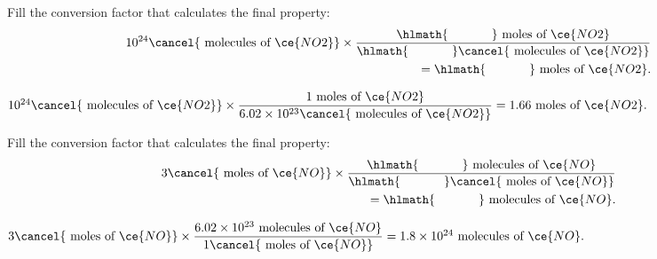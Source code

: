 \documentclass[main.tex]{subfiles}
\begin{document}
\begin{multicols*}{2}
\begin{question}[ID=\the\value{numA}]
Fill the conversion factor that calculates the final property:
 \begin{equation*}\begin{split}
10^{24}\cancel{\text{ molecules of }\ce{NO2}} \times \dfrac{\hlmath{\hspace{35pt}}\text{ moles of }\ce{NO2}}{\hlmath{\hspace{35pt}}\cancel{\text{ molecules of }\ce{NO2}}}\\
=\hlmath{\hspace{35pt}}\text{ moles of }\ce{NO2}.
\end{split}\end{equation*}
\end{question}
\begin{solution}
$
10^{24}\cancel{\text{ molecules of }\ce{NO2}} \times \dfrac{   1    \text{ moles of }\ce{NO2}}{   6.02\times 10^{23}    \cancel{\text{ molecules of }\ce{NO2}}}
=   1.66   \text{ moles of }\ce{NO2}.
$
\hspace{0.1cm}\end{solution}%
\begin{question}[ID=\the\value{numA}]
Fill the conversion factor that calculates the final property:
 \begin{equation*}\begin{split}
3\cancel{\text{ moles of }\ce{NO}} \times \dfrac{\hlmath{\hspace{35pt}}\text{ molecules of }\ce{NO}}{\hlmath{\hspace{35pt}}\cancel{\text{ moles of }\ce{NO}}}\\
=\hlmath{\hspace{35pt}}\text{ molecules of }\ce{NO}.
\end{split}\end{equation*}
\end{question}
\begin{solution}
$
3\cancel{\text{ moles of }\ce{NO}} \times \dfrac{   6.02\times 10^{23}  \text{ molecules of }\ce{NO}}{   1   \cancel{\text{ moles of }\ce{NO}}}
=  1.8\times 10^{24}  \text{ molecules of }\ce{NO}.
$
\hspace{0.1cm}\end{solution}%
\begin{question}[ID=\the\value{numA}]

\end{question}
\end{multicols*}
\end{document}
